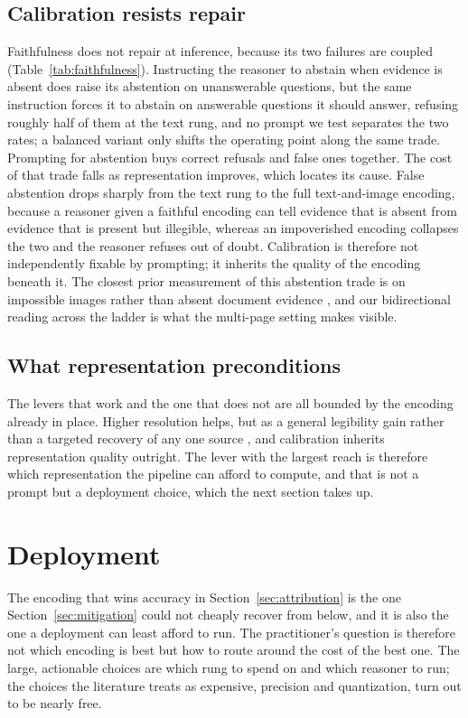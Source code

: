 \documentclass[11pt]{article}
\begin{document}
\subsection{Calibration resists repair}
\label{subsec:mit_calibration}
Faithfulness does not repair at inference, because its two failures are coupled (Table~\ref{tab:faithfulness}). Instructing the reasoner to abstain when evidence is absent does raise its abstention on unanswerable questions, but the same instruction forces it to abstain on answerable questions it should answer, refusing roughly half of them at the text rung, and no prompt we test separates the two rates; a balanced variant only shifts the operating point along the same trade. Prompting for abstention buys correct refusals and false ones together.
The cost of that trade falls as representation improves, which locates its cause. False abstention drops sharply from the text rung to the full text-and-image encoding, because a reasoner given a faithful encoding can tell evidence that is absent from evidence that is present but illegible, whereas an impoverished encoding collapses the two and the reasoner refuses out of doubt. Calibration is therefore not independently fixable by prompting; it inherits the quality of the encoding beneath it. The closest prior measurement of this abstention trade is on impossible images rather than absent document evidence \citep{saadat2025visiontrap}, and our bidirectional reading across the ladder is what the multi-page setting makes visible.

\subsection{What representation preconditions}
\label{subsec:mit_precondition}
The levers that work and the one that does not are all bounded by the encoding already in place. Higher resolution helps, but as a general legibility gain rather than a targeted recovery of any one source \citep{li2025textorpixels}, and calibration inherits representation quality outright. The lever with the largest reach is therefore which representation the pipeline can afford to compute, and that is not a prompt but a deployment choice, which the next section takes up.

\section{Deployment}
\label{sec:deployment}

The encoding that wins accuracy in Section~\ref{sec:attribution} is the one Section~\ref{sec:mitigation} could not cheaply recover from below, and it is also the one a deployment can least afford to run. The practitioner's question is therefore not which encoding is best but how to route around the cost of the best one. The large, actionable choices are which rung to spend on and which reasoner to run; the choices the literature treats as expensive, precision and quantization, turn out to be nearly free.
\end{document}
